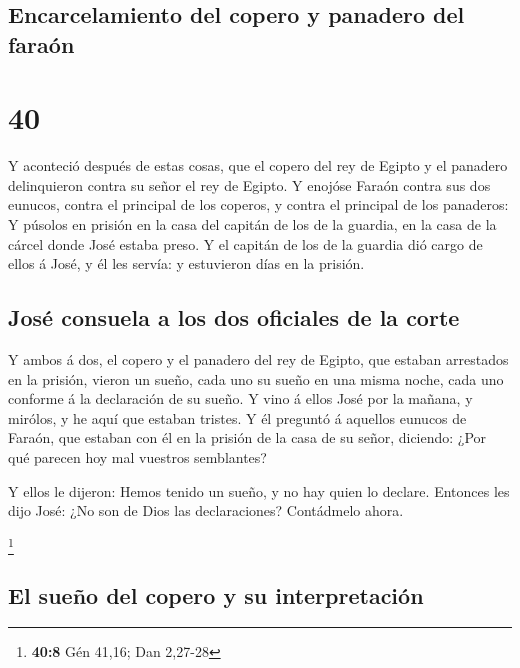 \hypertarget{encarcelamiento-del-copero-y-panadero-del-farauxf3n}{%
\subsection{Encarcelamiento del copero y panadero del
faraón}\label{encarcelamiento-del-copero-y-panadero-del-farauxf3n}}

\hypertarget{section-39}{%
\section{40}\label{section-39}}

 Y aconteció después de estas cosas, que el copero del rey
de Egipto y el panadero delinquieron contra su señor el rey de Egipto.
 Y enojóse Faraón contra sus dos eunucos, contra el
principal de los coperos, y contra el principal de los panaderos:
 Y púsolos en prisión en la casa del capitán de los de la
guardia, en la casa de la cárcel donde José estaba preso.  Y
el capitán de los de la guardia dió cargo de ellos á José, y él les
servía: y estuvieron días en la prisión.

\hypertarget{josuxe9-consuela-a-los-dos-oficiales-de-la-corte}{%
\subsection{José consuela a los dos oficiales de la
corte}\label{josuxe9-consuela-a-los-dos-oficiales-de-la-corte}}

 Y ambos á dos, el copero y el panadero del rey de Egipto,
que estaban arrestados en la prisión, vieron un sueño, cada uno su sueño
en una misma noche, cada uno conforme á la declaración de su sueño.
 Y vino á ellos José por la mañana, y mirólos, y he aquí que
estaban tristes.  Y él preguntó á aquellos eunucos de
Faraón, que estaban con él en la prisión de la casa de su señor,
diciendo: ¿Por qué parecen hoy mal vuestros semblantes?

 Y ellos le dijeron: Hemos tenido un sueño, y no hay quien
lo declare. Entonces les dijo José: ¿No son de Dios las declaraciones?
Contádmelo ahora.

\footnote{\textbf{40:8} Gén 41,16; Dan 2,27-28}

\hypertarget{el-sueuxf1o-del-copero-y-su-interpretaciuxf3n}{%
\subsection{El sueño del copero y su
interpretación}\label{el-sueuxf1o-del-copero-y-su-interpretaciuxf3n}}

